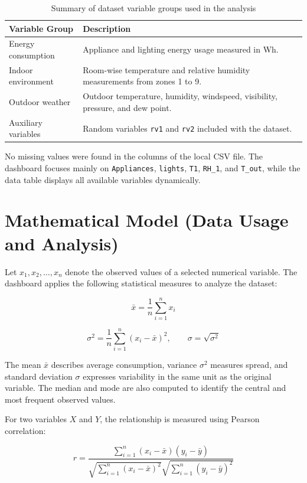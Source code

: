 \documentclass[12pt,a4paper]{article}
\begin{document}
\begin{table}[htbp]
\centering
\caption{Summary of dataset variable groups used in the analysis}
\label{tab:dataset-variable-groups}
\begin{tabular}{|p{4cm}|p{8.5cm}|}
\hline
\textbf{Variable Group} & \textbf{Description} \\
\hline
Energy consumption & Appliance and lighting energy usage measured in Wh. \\
\hline
Indoor environment & Room-wise temperature and relative humidity measurements from zones 1 to 9. \\
\hline
Outdoor weather & Outdoor temperature, humidity, windspeed, visibility, pressure, and dew point. \\
\hline
Auxiliary variables & Random variables \texttt{rv1} and \texttt{rv2} included with the dataset. \\
\hline
\end{tabular}
\end{table}

No missing values were found in the columns of the local CSV file. The dashboard focuses mainly on \texttt{Appliances}, \texttt{lights}, \texttt{T1}, \texttt{RH\_1}, and \texttt{T\_out}, while the data table displays all available variables dynamically.

\section{Mathematical Model (Data Usage and Analysis)}
\label{sec:model}

Let $x_1, x_2, \ldots, x_n$ denote the observed values of a selected numerical variable. The dashboard applies the following statistical measures to analyze the dataset:

\[
\bar{x} = \frac{1}{n}\sum_{i=1}^{n}x_i
\]

\[
\sigma^2 = \frac{1}{n}\sum_{i=1}^{n}(x_i-\bar{x})^2, \qquad
\sigma = \sqrt{\sigma^2}
\]

The mean $\bar{x}$ describes average consumption, variance $\sigma^2$ measures spread, and standard deviation $\sigma$ expresses variability in the same unit as the original variable. The median and mode are also computed to identify the central and most frequent observed values.

For two variables $X$ and $Y$, the relationship is measured using Pearson correlation:

\[
r = \frac{\sum_{i=1}^{n}(x_i-\bar{x})(y_i-\bar{y})}
{\sqrt{\sum_{i=1}^{n}(x_i-\bar{x})^2}\sqrt{\sum_{i=1}^{n}(y_i-\bar{y})^2}}
\]
\end{document}
